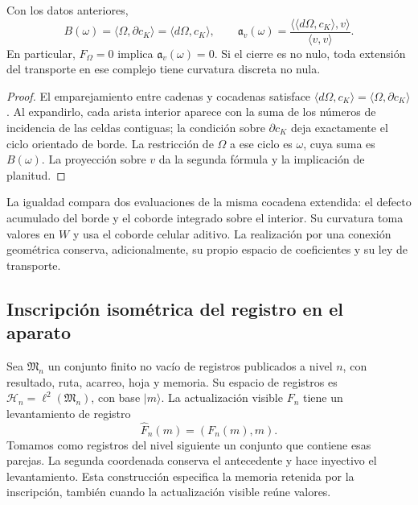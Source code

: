 \begin{theorem}
\label{vii:thm:observador-stokes}
Con los datos anteriores,
\begin{equation}
 B(\omega)=\langle\Omega,\partial c_K\rangle
          =\langle d\Omega,c_K\rangle,
 \qquad
 \mathfrak a_v(\omega)
 =\frac{\langle\langle d\Omega,c_K\rangle,v\rangle}
        {\langle v,v\rangle}.
 \label{vii:eq:observador-stokes}
\end{equation}
En particular, \(F_\Omega=0\) implica \(\mathfrak a_v(\omega)=0\).
Si el cierre es no nulo, toda extensión del transporte en ese complejo
tiene curvatura discreta no nula.
\end{theorem}

\begin{proof}
El emparejamiento entre cadenas y cocadenas satisface
\(\langle d\Omega,c_K\rangle=\langle\Omega,\partial c_K\rangle\).
Al expandirlo, cada arista interior aparece con la suma de los números
de incidencia de las celdas contiguas; la condición sobre
\(\partial c_K\) deja exactamente el ciclo orientado de borde.
La restricción de \(\Omega\) a ese ciclo es \(\omega\), cuya suma
es \(B(\omega)\). La proyección sobre \(v\) da la segunda fórmula
y la implicación de planitud.
\end{proof}

La igualdad compara dos evaluaciones de la misma cocadena extendida:
el defecto acumulado del borde y el coborde integrado sobre el interior.
Su curvatura toma valores en \(W\) y usa el coborde celular aditivo.
La realización por una conexión geométrica conserva, adicionalmente,
su propio espacio de coeficientes y su ley de transporte.

\subsection{Inscripción isométrica del registro en el aparato}
\label{vii:sec:observador-aparato}

Sea \(\mathfrak M_n\) un conjunto finito no vacío de registros
publicados a nivel \(n\), con resultado, ruta, acarreo, hoja y memoria.
Su espacio de registros es
\(\mathcal H_n=\ell^2(\mathfrak M_n)\), con base \(|m\rangle\).
La actualización visible \(F_n\) tiene un levantamiento de registro
\[
 \widehat F_n(m)=(F_n(m),m).
\]
Tomamos como registros del nivel siguiente un conjunto que contiene esas
parejas. La segunda coordenada conserva el antecedente y hace inyectivo
el levantamiento. Esta construcción especifica la memoria retenida por
la inscripción, también cuando la actualización visible reúne valores.


